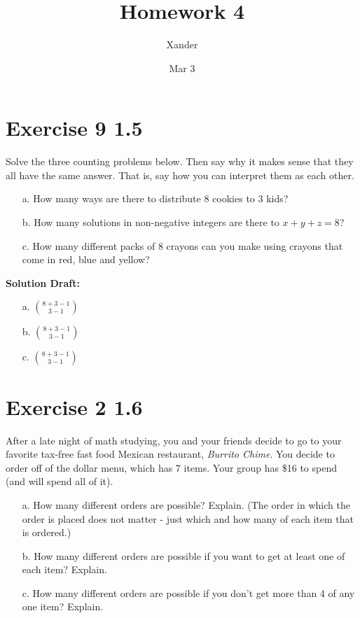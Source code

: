 \documentclass{article}
\title{Homework 4}
\author{Xander}
\date{Mar 3}
\begin{document}
\maketitle


\section*{Exercise 9 1.5}  


Solve the three counting problems below. Then say why it makes sense that they all have the same answer. That is, say how you can interpret them as each other.
\begin{enumerate}
    \item[a.] How many ways are there to distribute 8 cookies to 3 kids?
    \item[b.] How many solutions in non-negative integers are there to \(x + y + z = 8\)?
    \item[c.] How many different packs of 8 crayons can you make using crayons that come in red, blue and yellow?
\end{enumerate}

\vspace{0.5cm}
\noindent\textbf{Solution Draft:} 
\vspace{0.2cm}

\begin{enumerate}
    \item[a.] \( \binom{8 + 3 - 1}{3 - 1} \)
    \item[b.] \( \binom{8 + 3 - 1}{3 - 1} \)
    \item[c.] \( \binom{8 + 3 - 1}{3 - 1} \)
\end{enumerate}

\section*{Exercise 2 1.6}  

After a late night of math studying, you and your friends decide to go to your favorite tax-free fast food Mexican restaurant, \textit{Burrito Chime}. You decide to order off of the dollar menu, which has 7 items. Your group has \$16 to spend (and will spend all of it).
\begin{enumerate}
    \item[a.] How many different orders are possible? Explain. (The order in which the order is placed does not matter - just which and how many of each item that is ordered.)
    \item[b.] How many different orders are possible if you want to get at least one of each item? Explain.
    \item[c.] How many different orders are possible if you don't get more than 4 of any one item? Explain.
\end{enumerate}
\end{document}
